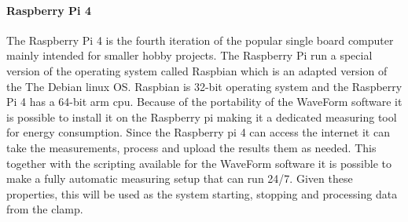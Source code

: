 \paragraph*{Raspberry Pi 4}
The Raspberry Pi 4 is the fourth iteration of the popular single board computer mainly intended for smaller hobby projects. The Raspberry Pi run a special version of the operating system called Raspbian which is an adapted version of the The Debian linux OS. Raspbian is 32-bit operating system and the Raspberry Pi 4 has a 64-bit arm cpu. Because of the portability of the WaveForm software it is possible to install it on the Raspberry pi making it a dedicated measuring tool for energy consumption. Since the Raspberry pi 4 can access the internet it can take the measurements, process and  upload the results them as needed. This together with the scripting available for the WaveForm software it is possible to make a fully automatic measuring setup that can run 24/7. Given these properties, this will be used as the system starting, stopping and processing data from the clamp.